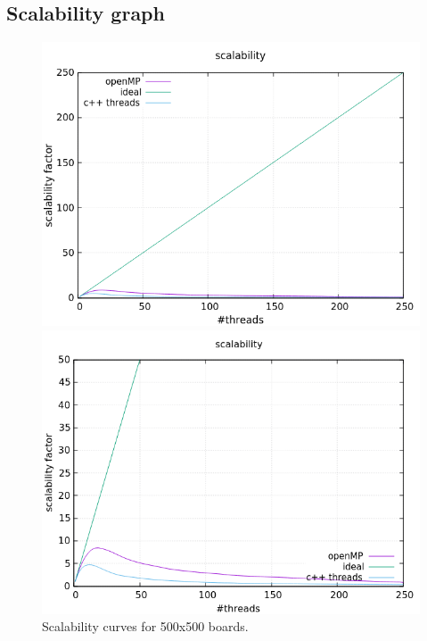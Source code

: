 \documentclass[a4paper,10pt]{article}
\begin{document}
	\subsection{Scalability graph}
		\begin{figure}[H]
		\centering
		\begin{minipage}[t]{0.55\linewidth}
			\includegraphics[width=\linewidth]{BenchMarkGOL/scalability/500/graph500_scal.png}
		\end{minipage}%
		\begin{minipage}[t]{0.55\linewidth}
			\includegraphics[width=\linewidth]{BenchMarkGOL/scalability/500/graph500_scal_zoom.png}
		\end{minipage}
		\caption{Scalability curves for 500x500 boards.}
		\label{500s}
	\end{figure}
\end{document}
